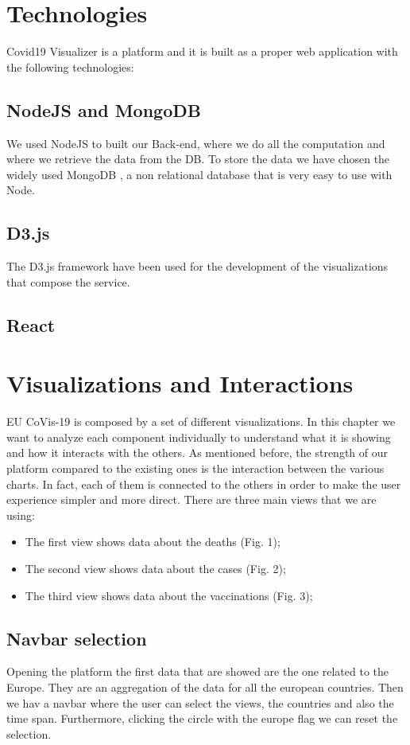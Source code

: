 \documentclass[10pt,conference]{IEEEtran}
\begin{document}
\section{Technologies}
Covid19 Visualizer is a platform and it is built as a proper web application with the following technologies:

\subsection{NodeJS and MongoDB}
We used NodeJS \cite{node} to built our Back-end, where we do all the computation and where we retrieve the data from the DB. To store the data we have chosen the widely used
MongoDB \cite{mongo}, a non relational database that is very easy to use with Node.

\subsection{D3.js}
The D3.js framework \cite{d3} have been used for the development of the visualizations that compose the service.

\subsection{React}

\section{Visualizations and Interactions}
EU CoVis-19 is composed by a set of different visualizations. In this chapter we want to analyze each component individually to understand what it
is showing and how it interacts with the others. As mentioned before, the strength of our platform compared to the existing ones is 
the interaction between the various charts. In fact, each of them is connected to the others in order to make the user experience 
simpler and more direct.
There are three main views that we are using:
\begin{itemize}
	\item The first view shows data about the deaths (Fig. 1);
	\item The second view shows data about the cases (Fig. 2);
	\item The third view shows data about the vaccinations (Fig. 3);
\end{itemize}

\subsection{Navbar selection}
Opening the platform the first data that are showed are the one related to the Europe. They are an aggregation of the data for all the european countries. 
Then we hav a navbar where the user can select the views, the countries and also the time span. Furthermore, clicking the circle with 
the europe flag we can reset the selection.
\end{document}
